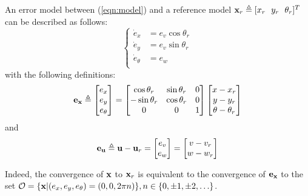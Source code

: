 \documentclass[twocolumn]{IEEEtran} %
\begin{document}
An error model between (\ref{eqn:model}) and a reference model ${\bf x}_r\triangleq [x_r~~y_r~~\theta_r]^T$ can be described as follows:
\begin{equation}\label{eqn:errormodel}
	\left\{
		\begin{aligned}
			\dot e_x	    &= e_v\cos\theta_r \\
			\dot e_y	    &= e_v\sin\theta_r \\
			\dot e_\theta &= e_w \\
		\end{aligned}
	\right.
\end{equation}
with the following definitions:
\begin{equation*}\label{eqn:T}
	{\bf e}_{\bf x} \triangleq \begin{bmatrix}
		e_x \\ e_y \\ e_\theta
	\end{bmatrix} =
	\begin{bmatrix}
		\cos\theta_r  & \sin\theta_r & 0 \\
		-\sin\theta_r & \cos\theta_r & 0 \\
		0		    & 0		    & 1
	\end{bmatrix} 
	\begin{bmatrix}
		x-x_r \\ y-y_r \\ \theta-\theta_r
	\end{bmatrix}
\end{equation*}
and
\begin{equation*}\label{eqn:eu}
	{\bf e}_{\bf u} \triangleq {\bf u} - {\bf u}_r = \begin{bmatrix}
		e_v \\ e_w
	\end{bmatrix} =
	\begin{bmatrix}
		v-v_r \\ w-w_r
	\end{bmatrix}
\end{equation*}

Indeed, the convergence of ${\bf x}$ to ${\bf x}_r$ is equivalent to the convergence of ${\bf e_x}$ to the set ${\cal O}=\{{\bf x}|(e_x,e_y,e_\theta)=(0,0,2\pi n)\},n\in \{0,\pm1,\pm2,\ldots\}$.
\end{document}
